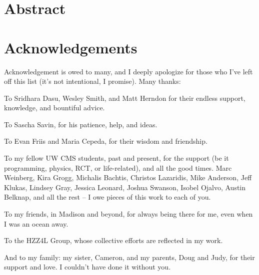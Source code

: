 \documentclass[oneside, letterpaper, 12pt, oldfontcommands]{memoir}
\begin{document}
\frontmatter


\thetitlepage
\clearpage


\setcounter{page}{1}

\section{Abstract}
\uwabstract
\cleardoublepage

\section{Acknowledgements}
Acknowledgement is owed to many, and I deeply apologize for those who I've
left off this list (it's not intentional, I promise). Many thanks:

To Sridhara Dasu, Wesley Smith, and Matt Herndon for their endless support,
knowledge, and bountiful advice.

To Sascha Savin, for his patience, help, and ideas.

To Evan Friis and Maria Cepeda, for their wisdom and friendship.

To my fellow UW CMS students, past and present, for the support (be it
programming, physics, RCT, or life-related), and all the good times. Marc
Weinberg, Kira Grogg, Michalis Bachtis, Christos Lazaridis, Mike Anderson, Jeff
Klukas, Lindsey Gray, Jessica Leonard, Joshua Swanson, Isobel Ojalvo, Austin
Belknap, and all the rest -- I owe pieces of this work to each of you.

To my friends, in Madison and beyond, for always being there for me, even when
I was an ocean away.

To the HZZ4L Group, whose collective efforts are reflected in my work.

And to my family: my sister, Cameron, and my parents, Doug and Judy, for their
support and love. I couldn't have done it without you.


\clearpage
\end{document}
